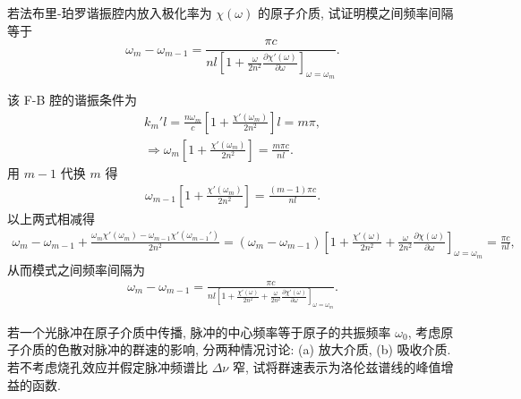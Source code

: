 \documentclass{note}
\begin{document}
\begin{exe}
    若法布里-珀罗谐振腔内放入极化率为 $\chi(\omega)$ 的原子介质, 试证明模之间频率间隔等于
    \[
        \omega_m-\omega_{m-1}=\frac{\pi c}{nl\left[1+\frac{\omega}{2n^2}\frac{\partial\chi'(\omega)}{\partial\omega}\right]_{\omega=\omega_m}}.
    \]
\end{exe}
\begin{pf}
    该 F-B 腔的谐振条件为
    \begin{gather}
        k_m'l=\frac{n\omega_m}{c}\left[1+\frac{\chi'(\omega_m)}{2n^2}\right]l=m\pi,\\
        \Longrightarrow\omega_m\left[1+\frac{\chi'(\omega_m)}{2n^2}\right]=\frac{m\pi c}{nl}.
    \end{gather}
    用 $m-1$ 代换 $m$ 得
    \begin{align}
        \omega_{m-1}\left[1+\frac{\chi'(\omega_m)}{2n^2}\right]=\frac{(m-1)\pi c}{nl}.
    \end{align}
    以上两式相减得
    \begin{align}
        \omega_m-\omega_{m-1}+\frac{\omega_m\chi'(\omega_m)-\omega_{m-1}\chi'(\omega_{m-1}')}{2n^2}=(\omega_m-\omega_{m-1})\left[1+\frac{\chi'(\omega)}{2n^2}+\frac{\omega}{2n^2}\frac{\partial\chi(\omega)}{\partial\omega}\right]_{\omega=\omega_m}=\frac{\pi c}{nl},
    \end{align}
    从而模式之间频率间隔为
    \begin{align}
        \omega_m-\omega_{m-1}=\frac{\pi c}{nl\left[1+\frac{\chi'(\omega)}{2n^2}+\frac{\omega}{2n^2}\frac{\partial\chi'(\omega)}{\partial\omega}\right]_{\omega=\omega_m}}.
    \end{align}
\end{pf}

\begin{exe}
    若一个光脉冲在原子介质中传播, 脉冲的中心频率等于原子的共振频率 $\omega_0$, 考虑原子介质的色散对脉冲的群速的影响, 分两种情况讨论: (a) 放大介质, (b) 吸收介质. 若不考虑烧孔效应并假定脉冲频谱比 $\Delta\nu$ 窄, 试将群速表示为洛伦兹谱线的峰值增益的函数.
\end{exe}
\begin{sol}

\end{sol}
\end{document}

